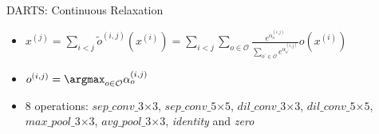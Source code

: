 \begin{frame}{DARTS: Continuous Relaxation}

        \begin{centering}
        {\footnotesize
        \begin{itemize}
            \item $x^{(j)} = \sum_{i<j}\tilde{o}^{(i,j)}(x^{(i)}) = \sum_{i<j}\sum_{o\in\mathcal{O}}\frac{e^{\alpha_{o}^{(i,j)}}}{\sum_{o^{\prime}\in\mathcal{O}}e^{\alpha_{o^{\prime}}^{(i,j)}}}o(x^{(i)})$
            \item $o^{(i,j)} = \argmax_{o\in\mathcal{O}}\alpha_{o}^{(i,j)}$
            \item 8 operations: $sep\_conv\_3$$\times$$3$, $sep\_conv\_5$$\times$$5$, $dil\_conv\_3$$\times$$3$, $dil\_conv\_5$$\times$$5$, $max\_pool\_3$$\times$$3$, $avg\_pool\_3$$\times$$3$, \textit{identity} and \textit{zero}
        \end{itemize}}%
        \end{centering}


\end{frame}
